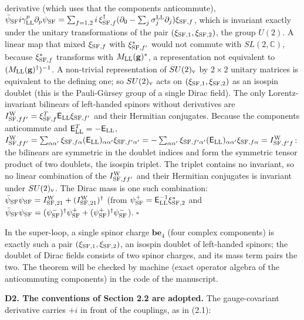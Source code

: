 \documentclass[
  10pt,
]{article}
\begin{document}
derivative (which uses that the components anticommute),
\(\bar\psi_{\rm SF}i\gamma^p_{\rm LL}\partial_p\psi_{\rm SF}=\sum_{f=1,2}i\,\xi_{{\rm SF},f}^\dagger(\partial_0-\sum_j\sigma^{\rm LL}_j\partial_j)\xi_{{\rm SF},f}\),
which is invariant exactly under the unitary transformations of the pair
\((\xi_{{\rm SF},1},\xi_{{\rm SF},2})\), the group \(U(2)\). A linear
map that mixed \(\xi_{{\rm SF},f}\) with \(\xi_{{\rm SF},f'}^*\) would
not commute with \(SL(2,\mathbb C)\), because \(\xi_{{\rm SF},f}^*\)
transforms with \(M_{\rm LL}(\mathbf g)^*\), a representation not
equivalent to \((M_{\rm LL}(\mathbf g)^\dagger)^{-1}\). A non-trivial
representation of \(SU(2)_{\rm v}\) by \(2\times2\) unitary matrices is
equivalent to the defining one; so \(SU(2)_{\rm v}\) acts on
\((\xi_{{\rm SF},1},\xi_{{\rm SF},2})\) as an isospin doublet (this is
the Pauli-Gürsey group of a single Dirac field). The only
Lorentz-invariant bilinears of left-handed spinors without derivatives
are
\(I^{\rm W}_{{\rm SF},ff'}=\xi_{{\rm SF},f}^T\mathsf E_{\rm LL}\xi_{{\rm SF},f'}\)
and their Hermitian conjugates. Because the components anticommute and
\(\mathsf E_{\rm LL}^T=-\mathsf E_{\rm LL}\),
\(I^{\rm W}_{{\rm SF},ff'}=\sum_{\alpha\alpha'}\xi_{{\rm SF},f\alpha}(\mathsf E_{\rm LL})_{\alpha\alpha'}\xi_{{\rm SF},f'\alpha'}=-\sum_{\alpha\alpha'}\xi_{{\rm SF},f'\alpha'}(\mathsf E_{\rm LL})_{\alpha\alpha'}\xi_{{\rm SF},f\alpha}=I^{\rm W}_{{\rm SF},f'f}\):
the bilinears are symmetric in the doublet indices and form the
symmetric tensor product of two doublets, the isospin triplet. The
triplet contains no invariant, so no linear combination of the
\(I^{\rm W}_{{\rm SF},ff'}\) and their Hermitian conjugates is invariant
under \(SU(2)_{\rm v}\). The Dirac mass is one such combination:
\(\bar\psi_{\rm SF}\psi_{\rm SF}=I^{\rm W}_{{\rm SF},21}+(I^{\rm W}_{{\rm SF},21})^\dagger\)
(from \(\psi^+_{\rm SF}=\mathsf E_{\rm LL}^{-1}\xi_{{\rm SF},2}^*\) and
\(\bar\psi_{\rm SF}\psi_{\rm SF}=(\psi^-_{\rm SF})^\dagger\psi^+_{\rm SF}+(\psi^+_{\rm SF})^\dagger\psi^-_{\rm SF}\)).
\(\square\)

In the super-loop, a single spinor charge \(\mathbf b\mathbf e_4\) (four
complex components) is exactly such a pair
\((\xi_{{\rm SF},1},\xi_{{\rm SF},2})\), an isospin doublet of
left-handed spinors; the doublet of Dirac fields consists of two spinor
charges, and its mass term pairs the two. The theorem will be checked by
machine (exact operator algebra of the anticommuting components) in the
code of the manuscript.

\textbf{D2. The conventions of Section 2.2 are adopted.} The
gauge-covariant derivative carries \(+i\) in front of the couplings, as
in (2.1):
\end{document}
